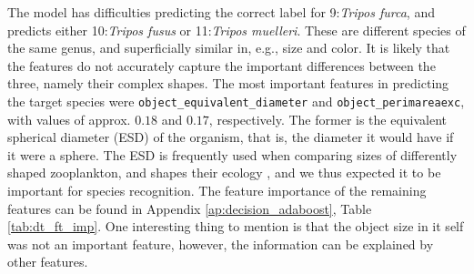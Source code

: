 The model has difficulties predicting the correct label for 9:\textit{Tripos furca}, and predicts either 10:\textit{Tripos fusus} or 11:\textit{Tripos muelleri}. These are different species of the same genus, and superficially similar in, e.g., size and color. It is likely that the features do not accurately capture the important differences between the three, namely their complex shapes. The most important features in predicting the target species were \verb|object_equivalent_diameter| and \verb|object_perimareaexc|, with values of approx. $0.18$ and $0.17$, respectively. The former is the equivalent spherical diameter (ESD) of the organism, that is, the diameter it would have if it were a sphere. The ESD is frequently used when comparing sizes of differently shaped zooplankton, and shapes their ecology \cite{kiorboe2008}, and we thus expected it to be important for species recognition. The feature importance of the remaining features can be found in Appendix \ref{ap:decision_adaboost}, Table \ref{tab:dt_ft_imp}. One interesting thing to mention is that the object size in it self was not an important feature, however, the information can be explained by other features.


